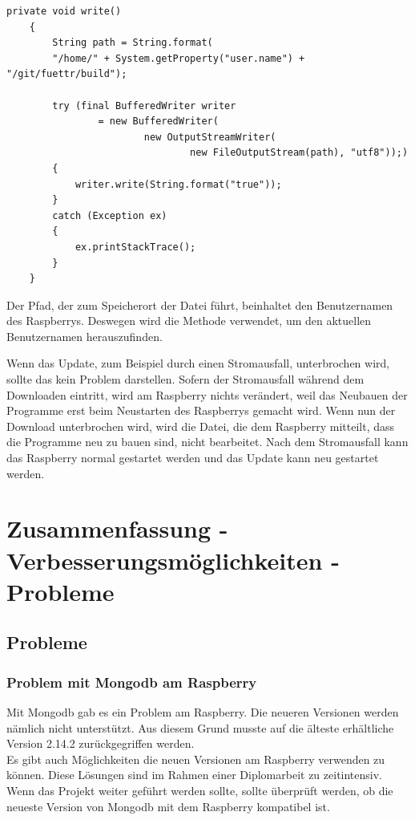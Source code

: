 \begin{lstlisting}[style=JavaStyle, caption= Writer]
    private void write()
    {
        String path = String.format(
        "/home/" + System.getProperty("user.name") + "/git/fuettr/build");

        try (final BufferedWriter writer
                = new BufferedWriter(
                        new OutputStreamWriter(
                                new FileOutputStream(path), "utf8"));)
        {
            writer.write(String.format("true"));
        }
        catch (Exception ex)
        {
            ex.printStackTrace();
        }
    }
\end{lstlisting}
Der Pfad, der zum Speicherort der Datei führt, beinhaltet den Benutzernamen des Raspberrys. Deswegen wird die Methode \textbf{} verwendet, um den aktuellen Benutzernamen herauszufinden.

\vspace{10pt}

Wenn das Update, zum Beispiel durch einen Stromausfall, unterbrochen wird, sollte das kein Problem darstellen. Sofern der Stromausfall während dem Downloaden eintritt, wird am Raspberry nichts verändert, weil das Neubauen der Programme erst beim Neustarten des Raspberrys gemacht wird. Wenn nun der Download unterbrochen wird, wird die Datei, die dem Raspberry mitteilt, dass die Programme neu zu bauen sind, nicht bearbeitet. Nach dem Stromausfall kann das Raspberry normal gestartet werden und das Update kann neu gestartet werden.

\newpage

\section{Zusammenfassung - Verbesserungsmöglichkeiten - Probleme}

\subsection{Probleme}
\subsubsection{Problem mit Mongodb am Raspberry}
Mit Mongodb gab es ein Problem am Raspberry. Die neueren Versionen werden nämlich nicht unterstützt. Aus diesem Grund musste auf die älteste erhältliche Version 2.14.2 zurückgegriffen werden.
\\ Es gibt auch Möglichkeiten die neuen Versionen am Raspberry verwenden zu können. Diese Lösungen sind im Rahmen einer Diplomarbeit zu zeitintensiv.
\\ Wenn das Projekt weiter geführt werden sollte, sollte überprüft werden, ob die neueste Version von Mongodb mit dem Raspberry kompatibel ist.
